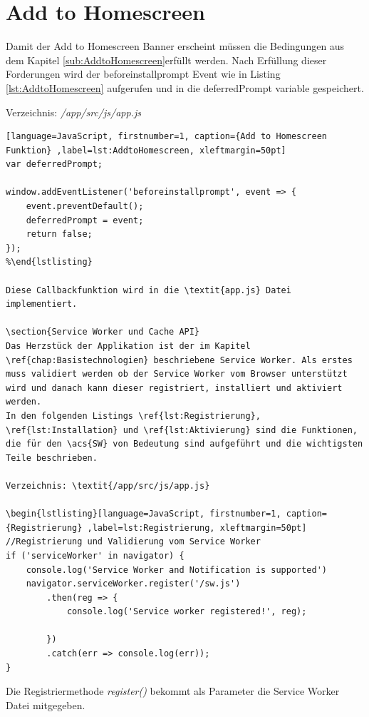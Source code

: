 \section{Add to Homescreen}
Damit der Add to Homescreen Banner erscheint müssen die Bedingungen aus dem Kapitel \ref{sub:AddtoHomescreen}erfüllt werden.
Nach Erfüllung dieser Forderungen wird der beforeinstallprompt Event wie in Listing \ref{lst:AddtoHomescreen} aufgerufen und in die deferredPrompt variable gespeichert.

Verzeichnis: \textit{/app/src/js/app.js}

\begin{lstlisting}[language=JavaScript, firstnumber=1, caption={Add to Homescreen Funktion} ,label=lst:AddtoHomescreen, xleftmargin=50pt]
var deferredPrompt;

window.addEventListener('beforeinstallprompt', event => {
    event.preventDefault();
    deferredPrompt = event;
    return false;
});
%\end{lstlisting}

Diese Callbackfunktion wird in die \textit{app.js} Datei implementiert. 

\section{Service Worker und Cache API}
Das Herzstück der Applikation ist der im Kapitel \ref{chap:Basistechnologien} beschriebene Service Worker. Als erstes muss validiert werden ob der Service Worker vom Browser unterstützt wird und danach kann dieser registriert, installiert und aktiviert werden.
In den folgenden Listings \ref{lst:Registrierung}, \ref{lst:Installation} und \ref{lst:Aktivierung} sind die Funktionen, die für den \acs{SW} von Bedeutung sind aufgeführt und die wichtigsten Teile beschrieben.

Verzeichnis: \textit{/app/src/js/app.js}

\begin{lstlisting}[language=JavaScript, firstnumber=1, caption={Registrierung} ,label=lst:Registrierung, xleftmargin=50pt]
//Registrierung und Validierung vom Service Worker
if ('serviceWorker' in navigator) {
    console.log('Service Worker and Notification is supported')
    navigator.serviceWorker.register('/sw.js')
        .then(reg => {
            console.log('Service worker registered!', reg);

        })
        .catch(err => console.log(err));
}
\end{lstlisting}
Die Registriermethode \textit{register()} bekommt als Parameter die Service Worker Datei mitgegeben.

